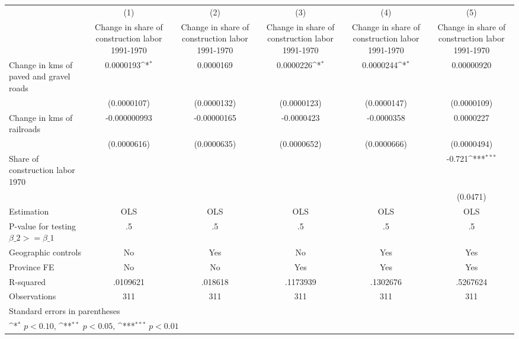 {
\def\sym#1{\ifmmode^{#1}\else\(^{#1}\)\fi}
\begin{tabular}{l*{5}{c}}
\hline\hline
                    &\multicolumn{1}{c}{(1)}&\multicolumn{1}{c}{(2)}&\multicolumn{1}{c}{(3)}&\multicolumn{1}{c}{(4)}&\multicolumn{1}{c}{(5)}\\
                    &\multicolumn{1}{c}{Change in share of construction labor 1991-1970}&\multicolumn{1}{c}{Change in share of construction labor 1991-1970}&\multicolumn{1}{c}{Change in share of construction labor 1991-1970}&\multicolumn{1}{c}{Change in share of construction labor 1991-1970}&\multicolumn{1}{c}{Change in share of construction labor 1991-1970}\\
\hline
Change in kms of paved and gravel roads&   0.0000193\sym{*}  &   0.0000169         &   0.0000226\sym{*}  &   0.0000244\sym{*}  &  0.00000920         \\
                    & (0.0000107)         & (0.0000132)         & (0.0000123)         & (0.0000147)         & (0.0000109)         \\
[1em]
Change in kms of railroads&-0.000000993         & -0.00000165         &  -0.0000423         &  -0.0000358         &   0.0000227         \\
                    & (0.0000616)         & (0.0000635)         & (0.0000652)         & (0.0000666)         & (0.0000494)         \\
[1em]
Share of construction labor 1970&                     &                     &                     &                     &      -0.721\sym{***}\\
                    &                     &                     &                     &                     &    (0.0471)         \\
\hline
Estimation          &         OLS         &         OLS         &         OLS         &         OLS         &         OLS         \\
P-value for testing $\beta\_2 >= \beta\_1$&          .5         &          .5         &          .5         &          .5         &          .5         \\
Geographic controls &          No         &         Yes         &          No         &         Yes         &         Yes         \\
Province FE         &          No         &          No         &         Yes         &         Yes         &         Yes         \\
R-squared           &    .0109621         &     .018618         &    .1173939         &    .1302676         &    .5267624         \\
Observations        &         311         &         311         &         311         &         311         &         311         \\
\hline\hline
\multicolumn{6}{l}{\footnotesize Standard errors in parentheses}\\
\multicolumn{6}{l}{\footnotesize \sym{*} \(p<0.10\), \sym{**} \(p<0.05\), \sym{***} \(p<0.01\)}\\
\end{tabular}
}
